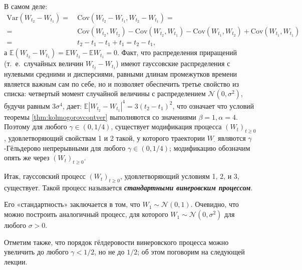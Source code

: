 \documentclass[10pt]{article}
\theoremstyle{boldnormal}
\newcommand{\EE}{{\ensuremath{\mathbb{E}}}}
\theoremstyle{boldremark}
\begin{document}
В самом деле:
\begin{align*}\text{Var}(W_{t_2}-W_{t_1}) 
    = & \ \text{Cov}(W_{t_2}-W_{t_1}, W_{t_2}-W_{t_1}) = 
    \\    
= & \ \text{Cov}(W_{t_2}, W_{t_2}) - \text{Cov}(W_{t_2}, W_{t_1}) 
- \text{Cov}(W_{t_1}, W_{t_2}) + \text{Cov}(W_{t_1}, W_{t_1}) 
\\
= & \  t_2-t_1-t_1+t_1 = t_2-t_1,
\end{align*}
а $\EE(W_{t_2}-W_{t_1})=\EE W_{t_2}- \EE W_{t_1} =0$.
Факт, что распределения приращений (т.~е.~случайных величин \(W_{t_2}-W_{t_1}\))
имеют гауссовские распределения с нулевыми средними и дисперсиями, равными 
длинам промежутков времени является важным сам по себе, но и позволяет 
обеспечить третье свойство из списка: четвертый момент случайной 
величины с распределением \(\mathcal{N}(0,\sigma^2)\), будучи 
равным \(3\sigma^4\), дает:
$\EE|W_{t_2}-W_{t_1}|^4 = 3(t_2-t_1)^2$, что означает 
что условий теоремы \ref{thm:kolmogorovcontver} 
выполняются со значениями \(\beta = 1, \alpha = 4\).
Поэтому для любого $\gamma \in (0, 1/4)$,
существует модификация процесса \((W_t)_{t\geq 0}\), удовлетворяющий 
свойствам 1 и 2 такой, у которого
траектории $W_{\cdot}$
являются $\gamma$-Гёльдерово непрерывными для любого 
\(\gamma\in (0,1/4)\); модификацию обозначим 
опять же через \((W_t)_{t\geq 0}\).

Итак, гауссовский процесс \((W_t)_{t\geq 0}\),
удовлетворяющий условиям 1, 2, и 3, существует. Такой процесс 
называется \textit{\textbf{стандартными винеровским процессом}}.

Его «стандартность» заключается в том, что 
\(W_1 \sim \mathcal{N}(0,1)\). Очевидно, что можно 
построить аналогичный процесс, для которого \(W_1 \sim \mathcal{N}(0,\sigma^2)\)
для любого \(\sigma > 0\).

Отметим также, что порядок гёлдеровости винеровского процесса
можно увеличить до любого \(\gamma < 1/2\), но не до \(1/2\);
об этом поговорим на следующей лекции.
\end{document}
